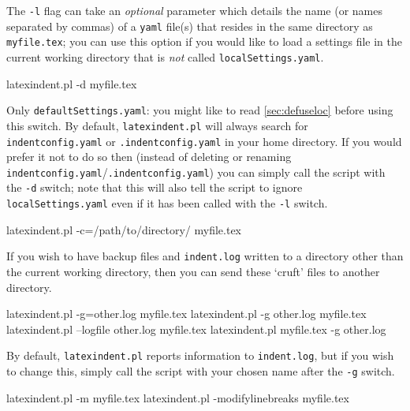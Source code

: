 The \texttt{-l} flag can take an \emph{optional} parameter which details the name (or names separated by commas) of a \texttt{yaml} file(s)
that resides in the same directory as \texttt{myfile.tex}; you can use this option if you would
like to load a settings file in the current working directory that is \emph{not} called \texttt{localSettings.yaml}.

\begin{commandshell}
latexindent.pl -d myfile.tex
      \end{commandshell}

Only \texttt{defaultSettings.yaml}: you might like to read \cref{sec:defuseloc} before
using this switch. By default, \texttt{latexindent.pl} will always search for
\texttt{indentconfig.yaml} or \texttt{.indentconfig.yaml}  in your home directory. If you would prefer it not to do so
then (instead of deleting or renaming \texttt{indentconfig.yaml}/\texttt{.indentconfig.yaml}) you can simply
call the script with the \texttt{-d} switch; note that this will also tell
the script to ignore \texttt{localSettings.yaml} even if it has been called with the
\texttt{-l} switch.

\begin{commandshell}
latexindent.pl -c=/path/to/directory/ myfile.tex
      \end{commandshell}

If you wish to have backup files and \texttt{indent.log} written to a directory
other than the current working directory, then you can send these `cruft' files
to another directory.

\begin{commandshell}
latexindent.pl -g=other.log myfile.tex
latexindent.pl -g other.log myfile.tex
latexindent.pl --logfile other.log myfile.tex
latexindent.pl myfile.tex -g other.log 
      \end{commandshell}

By default, \texttt{latexindent.pl} reports information to \texttt{indent.log}, but if you wish to change this, simply
call the script with your chosen name after the \texttt{-g} switch.

\begin{commandshell}
latexindent.pl -m myfile.tex
latexindent.pl -modifylinebreaks myfile.tex
      \end{commandshell}

